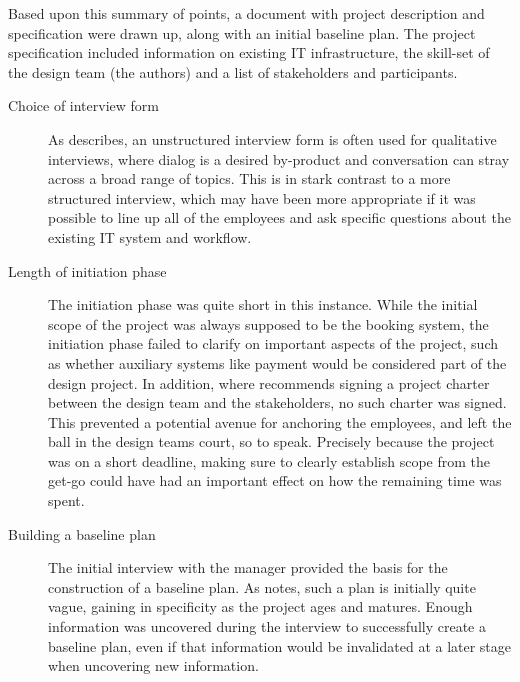 Based upon this summary of points, a document with project description and
specification were drawn up, along with an initial baseline plan. The project
specification included information on existing IT infrastructure, the skill-set
of the design team (the authors) and a list of stakeholders and participants.

\begin{description}
    \item [Choice of interview form] As \cite[p.228]{bodker2004participatory} describes,
        an unstructured interview form is often used for qualitative interviews,
        where dialog is a desired by-product and conversation can stray across a
        broad range of topics. This is in stark contrast to a more structured
        interview, which may have been more appropriate if it was possible to line 
        up all of the employees and ask specific questions about the existing IT
        system and workflow.

    \item [Length of initiation phase] The initiation phase was quite short in this instance.
        While the initial scope of the project was always supposed to be the
        booking system, the initiation phase failed to clarify on important
        aspects of the project, such as whether auxiliary systems like payment 
        would be considered part of the design project. In addition, where
        \cite{bodker2004participatory} recommends signing a project charter
        between the design team and the stakeholders, no such charter was
        signed. This prevented a potential avenue for anchoring the employees,
        and left the ball in the design teams court, so to speak. Precisely
        because the project was on a short deadline, making sure to clearly
        establish scope from the get-go could have had an important effect on
        how the remaining time was spent.

    \item [Building a baseline plan] The initial interview with the manager
        provided the basis for the construction of a baseline plan. As
        \cite{bodker2004participatory} notes, such a plan is initially quite
        vague, gaining in specificity as the project ages and matures. Enough
        information was uncovered during the interview to successfully create a
        baseline plan, even if that information would be invalidated at a later
        stage when uncovering new information.
\end{description}

